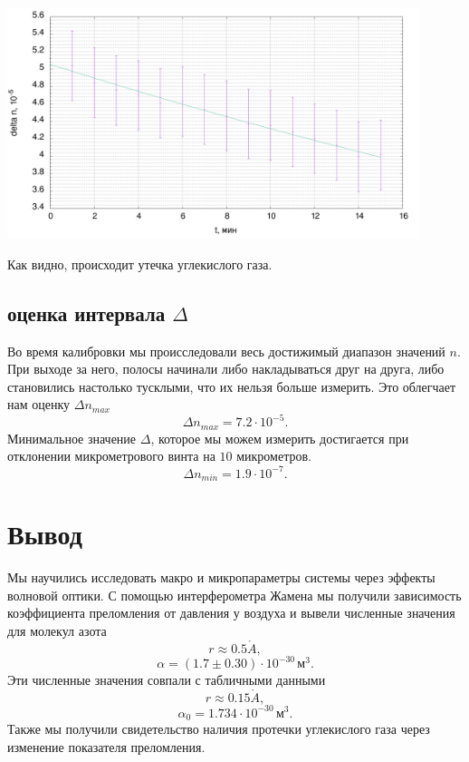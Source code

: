 \documentclass[a4paper,12pt]{article}
\renewcommand{\AA}{\ensuremath{\mathring{A}}}
\begin{document}
\begin{center}
\includegraphics[width=0.90\textwidth]{3.png}
\end{center}

Как видно, происходит утечка углекислого газа.

\subsection{оценка интервала $\Delta$}
Во время калибровки мы происследовали весь достижимый диапазон значений $n$. При выходе за него, полосы начинали либо накладываться друг на друга, либо становились настолько тусклыми, что их нельзя больше измерить. Это облегчает нам оценку $\Delta n_{max}$
\[\Delta n_{max} = 7.2 \cdot 10^{-5}.\]
Минимальное значение $\Delta$, которое мы можем измерить достигается при отклонении микрометрового винта на $10$ микрометров.
\[\Delta n_{min} = 1.9 \cdot 10^{-7}.\]

\section*{Вывод}
Мы научились исследовать макро и микропараметры системы через эффекты волновой оптики. С помощью интерферометра Жамена мы получили зависимость коэффициента преломления от давления у воздуха и вывели численные значения для молекул азота
\[r \approx 0.5 \AA,\]
\[\alpha = (1.7\pm0.30) \cdot 10^{-30}\,\text{м}^3.\]
Эти численные значения совпали с табличными данными
\[r \approx 0.15 \AA,\]
\[\alpha_0 = 1.734 \cdot 10^{-30}\,\text{м}^3.\]
Также мы получили свидетельство наличия протечки углекислого газа через изменение показателя преломления.
\end{document}
